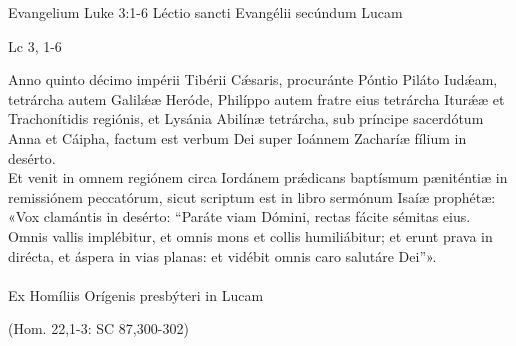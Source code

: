 \documentclass[options]{article}
\begin{document}
	Evangelium	Luke 3:1-6
		Léctio sancti Evangélii secúndum Lucam
		\begin{flushright}
			Lc 3, 1-6
		\end{flushright}

	Anno quinto décimo impérii Tibérii C\'{æ}saris, procuránte Póntio Piláto Iud\'{æ}am, tetrárcha autem Galil\'{æ}æ Heróde, Philíppo autem fratre eius tetrárcha Itur\'{æ}æ et Trachonítidis regiónis, et Lysánia Abilínæ tetrárcha, sub príncipe sacerdótum Anna et Cáipha, factum est verbum Dei super Ioánnem Zacharíæ fílium in desérto.\\
	Et venit in omnem regiónem circa Iordánem pr\'{æ}dicans baptísmum pæniténtiæ in remissiónem peccatórum, sicut scriptum est in libro sermónum Isaíæ prophétæ:
	«Vox clamántis in desérto: “Paráte viam Dómini, rectas fácite sémitas eius. Omnis vallis implébitur, et omnis mons et collis humiliábitur; et erunt prava in dirécta, et áspera in vias planas: et vidébit omnis caro salutáre Dei”».\\
	\\
Ex Homíliis Orígenis presbýteri in Lucam
	\begin{flushright}
			(Hom. 22,1-3: SC 87,300-302)
	\end{flushright}
\end{document}
